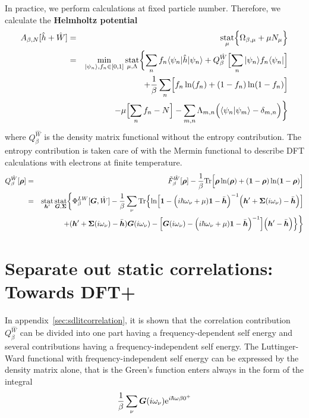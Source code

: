 \documentclass[11pt,a4paper]{report}
\begin{document}
In practice, we perform calculations at fixed particle
number. Therefore, we calculate the \textbf{Helmholtz
  potential}
\begin{eqnarray}
A_{\beta,N}[\hat{h}+\hat{W}]
&=&\operatorname*{stat}_\mu\Bigl\lbrace\Omega_{\beta,\mu}+\mu N_\mu\Bigr\rbrace
\nonumber\\
&=&\min_{|\psi_n\rangle,f_n\in[0,1]}\operatorname*{stat}_{\mu,\Lambda}
\biggl\lbrace\sum_n f_n\langle\psi_n|\hat{h}|\psi_n\rangle
+Q_\beta^{\hat{W}}\Bigl[\sum_n|\psi_n\rangle f_n\langle\psi_n|\Bigr]
\nonumber\\
&&+\frac{1}{\beta}\sum_n\Bigl[f_n\ln(f_n)+(1-f_n)\ln(1-f_n)\Bigr]
\nonumber\\
&&
-\mu\Bigl[\sum_n f_n-N\Bigr]
-\sum_{m,n}\Lambda_{m,n}\Bigl(\langle\psi_n|\psi_m\rangle-\delta_{m,n}\Bigr)
\biggr\rbrace
\label{eq:hp}
\end{eqnarray}
where $Q^{\hat{W}}_\beta$ is the density matrix functional without the
  entropy contribution.  The entropy contribution is taken care of
  with the Mermin functional\cite{mermin65_pr137_a1441} to describe
  DFT calculations with electrons at finite temperature.
\begin{eqnarray}
Q^{\hat{W}}_\beta[\bm{\rho}]
&=&\tilde{F}^{\hat{W}}_\beta[\bm{\rho}]
-
\frac{1}{\beta}\mathrm{Tr}\Bigl[
\bm{\rho}\ln(\bm{\rho})+(\bm{1}-\bm{\rho})\ln(\bm{1}-\bm{\rho})\Bigr]
\nonumber\\
&=&
\operatorname*{stat}_{\bm{h}'}\operatorname*{stat}_{\bm{G},\bm{\Sigma}}
\biggl\lbrace
\Phi^{LW}_\beta[\bm{G},\hat{W}]
-\frac{1}{\beta}\sum_\nu\mathrm{Tr}\Bigl\lbrace
\ln\Bigl[
\bm{1}-
\Bigl(i\hbar\omega_\nu+\mu)\bm{1}-\bar{\bm{h}}\Bigr)^{-1}
\Bigl(\bm{h}'+\bm{\Sigma}(i\omega_\nu)-\bar{\bm{h}}\Bigr)
\Bigr]
\nonumber\\&&
+(\bm{h}'+\bm{\Sigma}(i\omega_\nu)-\bar{\bm{h}})\bm{G}(i\omega_\nu)
-
\Bigl[
\bm{G}(i\omega_\nu)
-\Bigl(i\hbar\omega_\nu+\mu)\bm{1}-\bar{\bm{h}}\Bigr)^{-1}
\Bigr]
\Bigl(\bm{h}'-\bar{\bm{h}}\Bigr)\Bigr\rbrace
\biggr\rbrace
\label{eq:dmfQgreen}
\end{eqnarray}

\section{Separate out static correlations: Towards DFT+}
In appendix~\ref{sec:sdlitcorrelation}, it is shown that the
correlation contribution $Q^{\hat{W}}_\beta$ can be divided into
one part having a frequency-dependent self energy and several
contributions having a frequency-independent self energy. The
Luttinger-Ward functional with frequency-independent self energy can
be expressed by the density matrix alone, that is the Green's function
enters always in the form of the integral
\begin{eqnarray}
\frac{1}{\beta}\sum_\nu\bm{G}(i\omega_\nu)\mathrm{e}^{i\hbar\omega\beta0^+}
\end{eqnarray}
\end{document}
